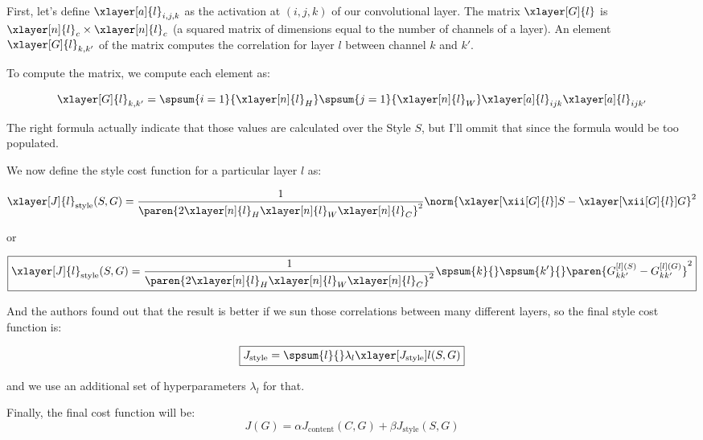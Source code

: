 \documentclass[12pt, a4paper, oneside]{book}
\begin{document}
First, let's define $\xlayer[a]{l}_{i,j,k}$ as the activation at $(i,j,k)$ of
our convolutional layer. The matrix $\xlayer[G]{l}$ is
$\xlayer[n]{l}_c\times\xlayer[n]{l}_c$ (a squared matrix of dimensions equal to
the number of channels of a layer). An element $\xlayer[G]{l}_{k,k'}$ of the
matrix computes the correlation for layer $l$ between channel $k$ and $k'$.

To compute the matrix, we compute each element as:

\[
\xlayer[G]{l}_{k,k'}=\spsum{i=1}{\xlayer[n]{l}_H}\spsum{j=1}{\xlayer[n]{l}_W}
\xlayer[a]{l}_{ijk} \xlayer[a]{l}_{ijk'}
\]

\begin{obs}
The right formula actually indicate that those values are calculated over the
Style $S$, but I'll ommit that since the formula would be too populated.
\end{obs}

We now define the style cost function for a particular layer $l$ as:

\[
\xlayer[J]{l}_{\text{style}}(S,G)=
\dfrac{1}{\paren{2\xlayer[n]{l}_H\xlayer[n]{l}_W\xlayer[n]{l}_C}^2}
\norm{\xlayer[\xii[G]{l}]{S}-\xlayer[\xii[G]{l}]{G}}^2
\]

or

\[ \boxed{
\xlayer[J]{l}_{\text{style}}(S,G)=
\dfrac{1}{\paren{2\xlayer[n]{l}_H\xlayer[n]{l}_W\xlayer[n]{l}_C}^2}
\spsum{k}{}\spsum{k'}{}
\paren{G_{kk'}^{[l](S)}-G_{kk'}^{[l](G)}}^2
}\]

And the authors found out that the result is better if we sun those correlations
between many different layers, so the final style cost function is:

\[ \boxed{
    J_{\text{style}}=\spsum{l}{}\lambda_l \xlayer[J_{\text{style}}]{l}(S,G)
}\]

and we use an additional set of hyperparameters $\lambda_l$ for that.

Finally, the final cost function will be:
\[ \boxed{
J(G) = \alpha J_{\text{content}}(C, G) + \beta J_{\text{style}}(S, G)
}\]

\end{document}
